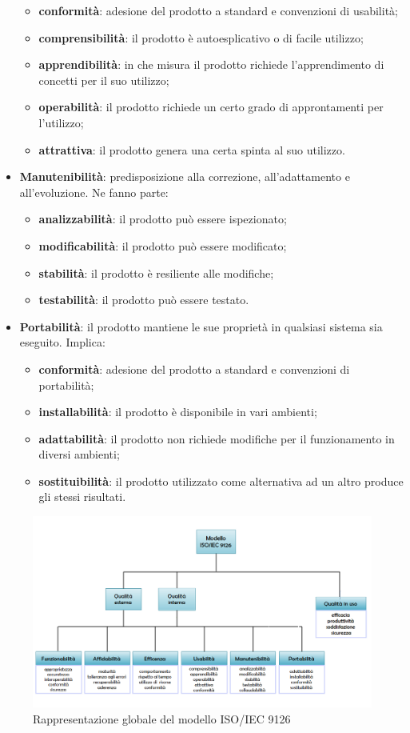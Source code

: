 \begin{itemize}
	\begin{itemize}
		\item \textbf{conformità}: adesione del prodotto a standard e convenzioni di usabilità;
		\item \textbf{comprensibilità}: il prodotto è autoesplicativo o di facile utilizzo;
		\item \textbf{apprendibilità}: in che misura il prodotto richiede l'apprendimento di concetti per il suo utilizzo;
		\item \textbf{operabilità}: il prodotto richiede un certo grado di approntamenti per l'utilizzo;
		\item \textbf{attrattiva}: il prodotto genera una certa spinta al suo utilizzo.
	\end{itemize}	
	\item \textbf{Manutenibilità}: predisposizione alla correzione, all'adattamento e all'evoluzione. Ne fanno parte: 
	\begin{itemize}
		\item \textbf{analizzabilità}: il prodotto può essere ispezionato;
		\item \textbf{modificabilità}: il prodotto può essere modificato;
		\item \textbf{stabilità}: il prodotto è resiliente alle modifiche;
		\item \textbf{testabilità}: il prodotto può essere testato.
	\end{itemize}
	\item \textbf{Portabilità}: il prodotto mantiene le sue proprietà in qualsiasi sistema sia eseguito. Implica:
	\begin{itemize}
		\item \textbf{conformità}: adesione del prodotto a standard e convenzioni di portabilità;
	\item \textbf{installabilità}: il prodotto è disponibile in vari ambienti;
	\item \textbf{adattabilità}: il prodotto non richiede modifiche per il funzionamento in diversi ambienti;
	\item \textbf{sostituibilità}: il prodotto utilizzato come alternativa ad un altro produce gli stessi risultati.
	\end{itemize}
\end{itemize}
\begin{figure}[H]
	\centering
	\includegraphics[width=15cm]{iso9126}
	\caption{Rappresentazione globale del modello ISO/IEC 9126}
\end{figure}
